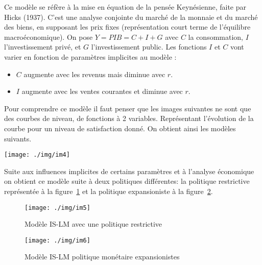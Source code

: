 \begin{tcolorbox}[title= Modèle IS-LM] 
	Ce modèle se réfère à la mise en équation de la pensée Keynésienne, faite par Hicks (1937). C'est une analyse conjointe du marché de la monnaie et du marché des biens, en supposant les prix fixes (représentation court terme de l'équilibre macroéconomique). 
  On pose $Y=PIB=C+I+G$ avec $C$ la consommation, $I$ l'investissement privé, et $G$ l'investissement public. Les fonctions $I$ et $C$ vont varier en fonction de paramètres implicites au modèle :
	\begin{itemize}[label=]
		\item $C$ augmente avec les revenus mais diminue avec $r$.
		\item $I$ augmente avec les ventes courantes et diminue avec $r$.
	\end{itemize}
Pour comprendre ce modèle il faut penser que les images suivantes ne sont que des courbes de niveau, de fonctions à 2 variables. Représentant l'évolution 
de la courbe pour un niveau de satisfaction donné. On obtient ainsi les modèles suivants. 

	\begin{center}
		\texttt{[image: ./img/im4]}
	\end{center}
  \label{fig:modele_islm}

Suite aux influences implicites de certains paramètres et à l'analyse économique
on obtient ce modèle suite à deux politiques différentes:
la politique restrictive représentée à la figure~\ref{fig:modele_islm_rest}
et la politique expansioniste à la figure~\ref{fig:modele_islm_exp}.
\end{tcolorbox}

\begin{figure}[h]
		\begin{center}
			\texttt{[image: ./img/im5]}
		\end{center}
		\caption{Modèle IS-LM avec une politique restrictive}
	   \label{fig:modele_islm_rest}
\end{figure}	
\begin{figure}[h]
		\begin{center}
			\texttt{[image: ./img/im6]}
		\end{center}
		\caption{Modèle IS-LM politique monétaire expansionistes}
	   \label{fig:modele_islm_exp}
\end{figure}

